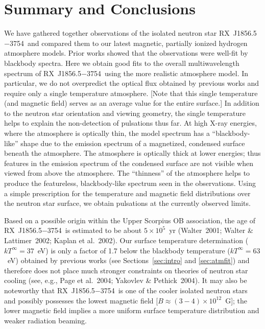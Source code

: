 \documentclass[useAMS,usegraphicx]{mn2e}
\newcommand{\etal}{et al.}
\newcommand{\rxjw}{RX~J1856.5$-$3754}
\newcommand{\tinfty}{\ensuremath{T^{\infty}}}
\begin{document}
\section{Summary and Conclusions} \label{sec:conclusion}

We have gathered together observations of the isolated neutron
star \rxjw\ and compared them to our latest magnetic, partially
ionized hydrogen atmosphere models.
Prior works showed that the observations were well-fit by blackbody spectra.
Here we obtain good fits to the overall multiwavelength spectrum
of \rxjw\ using the more realistic atmosphere model.
In particular, we do not overpredict the optical flux obtained by
previous works and require only a single temperature atmosphere.
[Note that this single temperature (and magnetic field) serves as an
average value for the entire surface.]
In addition to the neutron star orientation and viewing geometry, the
single temperature helps to explain the non-detection of pulsations thus far.
At high X-ray energies, where the atmosphere is optically thin,
the model spectrum has a ``blackbody-like'' shape due to the emission
spectrum of a magnetized, condensed surface beneath the atmosphere.
The atmosphere is optically thick at lower energies;
thus features in the emission spectrum of the condensed surface are not
visible when viewed from above the atmosphere.
The ``thinness'' of the atmosphere helps to produce the featureless,
blackbody-like spectrum seen in the observations.
Using a simple prescription for the temperature and magnetic field
distributions over the neutron star surface,
we obtain pulsations at the currently observed limits.

Based on a possible origin within the Upper Scorpius OB association,
the age of \rxjw\ is estimated to be about $5\times 10^5$~yr
(Walter~2001; Walter \& Lattimer~2002; Kaplan \etal~2002).
Our surface temperature determination ($k\tinfty=37$~eV) is only
a factor of 1.7
below the blackbody temperature ($k\tinfty=63$~eV) obtained by previous
works (see Sections~\ref{sec:intro} and \ref{sec:atmfit}) and therefore
does not place much stronger constraints on theories of neutron star
cooling (see, e.g., Page \etal~2004; Yakovlev \& Pethick~2004).
It may also be noteworthy that \rxjw\ is one of the cooler isolated
neutron stars and possibly possesses the lowest magnetic field
[$B\approx (3-4)\times 10^{12}$~G]; the lower magnetic field implies a more
uniform surface temperature distribution and weaker radiation beaming.
\end{document}
